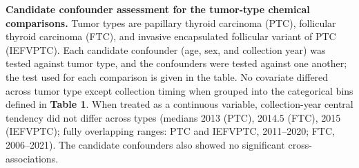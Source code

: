 \textbf{Candidate confounder assessment for the tumor-type chemical comparisons.} Tumor types are papillary thyroid carcinoma (PTC), follicular thyroid carcinoma (FTC), and invasive encapsulated follicular variant of PTC (IEFVPTC). Each candidate confounder (age, sex, and collection year) was tested against tumor type, and the confounders were tested against one another; the test used for each comparison is given in the table. No covariate differed across tumor type except collection timing when grouped into the categorical bins defined in \textbf{Table 1}. When treated as a continuous variable, collection-year central tendency did not differ across types (medians 2013 (PTC), 2014.5 (FTC), 2015 (IEFVPTC); fully overlapping ranges: PTC and IEFVPTC, 2011--2020; FTC, 2006--2021). The candidate confounders also showed no significant cross-associations.
